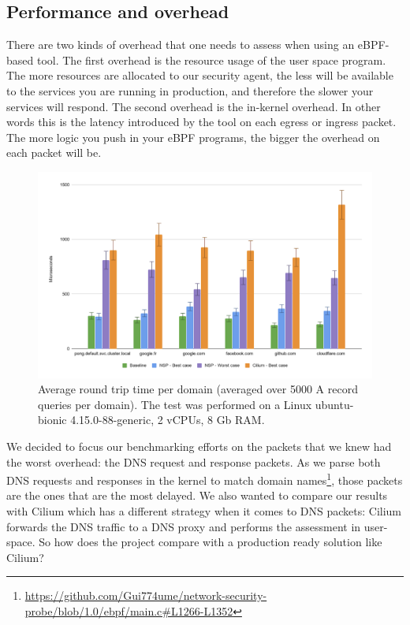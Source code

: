 \newpage

\subsection{Performance and overhead}

There are two kinds of overhead that one needs to assess when using an eBPF-based tool. The first overhead is the resource usage of the user space program. The more resources are allocated to our security agent, the less will be available to the services you are running in production, and therefore the slower your services will respond. The second overhead is the in-kernel overhead. In other words this is the latency introduced by the tool on each egress or ingress packet. The more logic you push in your eBPF programs, the bigger the overhead on each packet will be.

\begin{figure}
  \centering
  \includegraphics[width=\textwidth]{ProcessLevelNetworkSecurityMonitoring/img/round-trip-time.png}
  \caption{Average round trip time per domain (averaged over 5000 A record queries per domain). The test was performed on a Linux ubuntu-bionic 4.15.0-88-generic, 2 vCPUs, 8 Gb RAM.}
  \label{fig:ProcessLevelNetworkSecurityMonitoring:round_trip_time}
\end{figure}

We decided to focus our benchmarking efforts on the packets that we knew had the worst overhead: the DNS request and response packets. As we parse both DNS requests and responses in the kernel to match domain names\footnote{\url{https://github.com/Gui774ume/network-security-probe/blob/1.0/ebpf/main.c#L1266-L1352}}, those packets are the ones that are the most delayed. We also wanted to compare our results with Cilium which has a different strategy when it comes to DNS packets: Cilium forwards the DNS traffic to a DNS proxy and performs the assessment in user-space. So how does the project compare with a production ready solution like Cilium?

